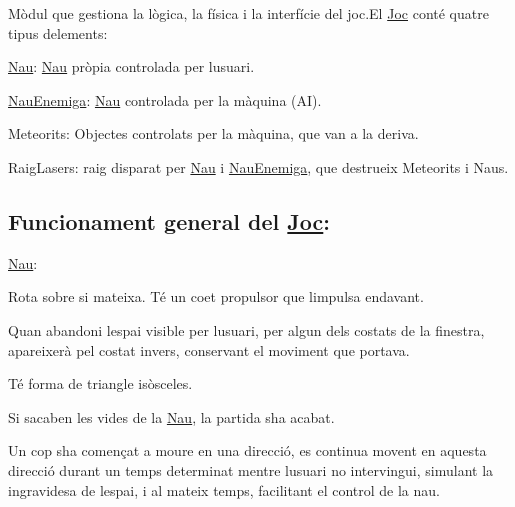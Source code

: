 Mòdul que gestiona la lògica, la física i la interfície del joc.\+El \hyperlink{class_joc}{Joc} conté quatre tipus d\textquotesingle{}elements\+:
\begin{DoxyItemize}
\item \hyperlink{class_nau}{Nau}\+: \hyperlink{class_nau}{Nau} pròpia controlada per l\textquotesingle{}usuari.
\item \hyperlink{class_nau_enemiga}{Nau\+Enemiga}\+: \hyperlink{class_nau}{Nau} controlada per la màquina (A\+I).
\item Meteorits\+: Objectes controlats per la màquina, que van a la deriva.
\item Raig\+Lasers\+: raig disparat per \hyperlink{class_nau}{Nau} i \hyperlink{class_nau_enemiga}{Nau\+Enemiga}, que destrueix Meteorits i Naus.
\end{DoxyItemize}

\subsection*{Funcionament general del \hyperlink{class_joc}{Joc}\+: }

\hyperlink{class_nau}{Nau}\+:
\begin{DoxyItemize}
\item Rota sobre si mateixa. Té un coet propulsor que l\textquotesingle{}impulsa endavant.
\item Quan abandoni l\textquotesingle{}espai visible per l\textquotesingle{}usuari, per algun dels costats de la finestra, apareixerà pel costat invers, conservant el moviment que portava.
\item Té forma de triangle isòsceles.
\item Si s\textquotesingle{}acaben les vides de la \hyperlink{class_nau}{Nau}, la partida s\textquotesingle{}ha acabat.
\item Un cop s\textquotesingle{}ha començat a moure en una direcció, es continua movent en aquesta direcció durant un temps determinat mentre l\textquotesingle{}usuari no intervingui, simulant la ingravidesa de l\textquotesingle{}espai, i al mateix temps, facilitant el control de la nau.
\end{DoxyItemize}

